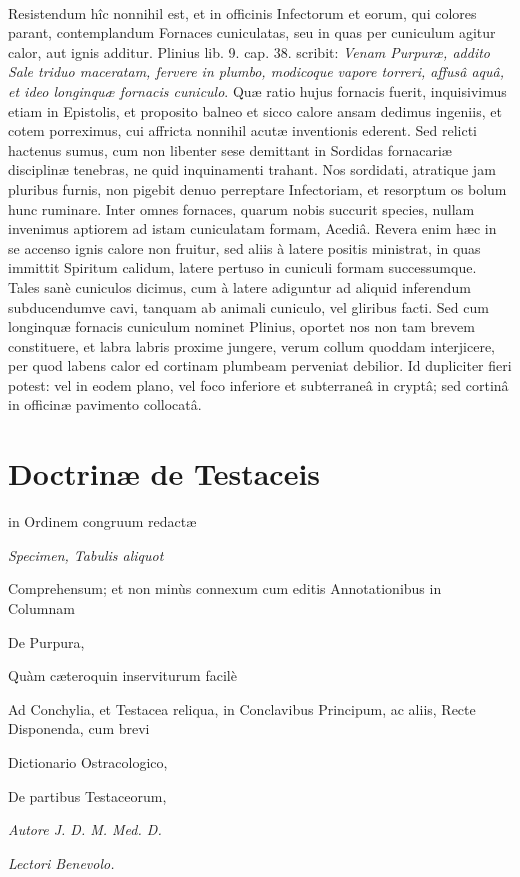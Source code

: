 \documentclass[a4paper, 11pt, oneside, polutonikogreek, german]{article}
\begin{document}
\paragraph{}
Resistendum hîc nonnihil est, et in officinis Infectorum et eorum, qui colores parant, contemplandum Fornaces cuniculatas, seu in quas per cuniculum agitur calor, aut ignis additur. Plinius lib. 9. cap. 38. scribit: \emph{Venam Purpuræ, addito Sale triduo maceratam, fervere in plumbo, modicoque vapore torreri, affusâ aquâ, et ideo longinquæ fornacis cuniculo}. Quæ ratio hujus fornacis fuerit, inquisivimus etiam in Epistolis, et proposito balneo et sicco calore ansam dedimus ingeniis, et cotem porreximus, cui affricta nonnihil acutæ inventionis ederent. Sed relicti hactenus sumus, cum non libenter sese demittant in Sordidas fornacariæ disciplinæ tenebras, ne quid inquinamenti trahant. Nos sordidati, atratique jam pluribus furnis, non pigebit denuo perreptare Infectoriam, et resorptum os bolum hunc ruminare. Inter omnes fornaces, quarum nobis succurit species, nullam invenimus aptiorem ad istam cuniculatam formam, Acediâ. Revera enim hæc in se accenso ignis calore non fruitur, sed aliis à latere positis ministrat, in quas immittit Spiritum calidum, latere pertuso in cuniculi formam successumque. Tales sanè cuniculos dicimus, cum à latere adiguntur ad aliquid inferendum subducendumve cavi, tanquam ab animali cuniculo, vel gliribus facti. Sed cum longinquæ fornacis cuniculum nominet Plinius, oportet nos non tam brevem constituere, et labra labris proxime jungere, verum collum quoddam interjicere, per quod labens calor ed cortinam plumbeam perveniat debilior. Id dupliciter fieri potest: vel in eodem plano, vel foco inferiore et subterraneâ in cryptâ; sed cortinâ in officinæ pavimento collocatâ.

\bigskip
\centerline{\EightStarTaper}
\centerline{\EightStarTaper\EightStarTaper}
\bigskip
\clearpage
\section{Doctrinæ de Testaceis}
\begin{center}
\normalsize in Ordinem congruum redactæ

\normalsize \emph{Specimen, Tabulis aliquot}

\footnotesize Comprehensum; et non minùs connexum cum editis Annotationibus in Columnam

\normalsize De Purpura,

\footnotesize Quàm cæteroquin inserviturum facilè

\footnotesize Ad Conchylia, et Testacea reliqua, in Conclavibus Principum, ac aliis, Recte Disponenda, cum brevi

\normalsize Dictionario Ostracologico,

\footnotesize De partibus Testaceorum,

\normalsize \emph{Autore J. D. M. Med. D.}
\end{center}
\bigskip
\centerline{\EightStarTaper}
\centerline{\EightStarTaper\EightStarTaper}
\bigskip
\begin{center}
\emph{Lectori Benevolo.}
\end{center}
\end{document}

